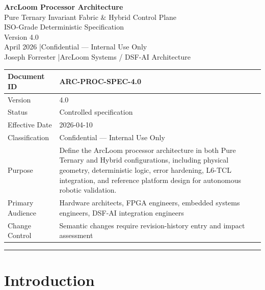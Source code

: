 \documentclass[11pt, a4paper]{article}
\begin{document}
\begin{center}
  {\LARGE \textbf{ArcLoom Processor Architecture}}\\[6pt]
  {\large Pure Ternary Invariant Fabric \& Hybrid Control Plane}\\[4pt]
  {\large ISO-Grade Deterministic Specification}\\[4pt]
  {\large Version 4.0}\\[8pt]
  {\color{al-gray}\small April 2026 \quad|\quad Confidential --- Internal Use Only}\\[4pt]
  {\color{al-gray}\small Joseph Forrester \quad|\quad ArcLoom Systems / DSF-AI Architecture}
\end{center}

\vspace{1em}

\renewcommand{\arraystretch}{1.15}
\begin{tabularx}{\textwidth}{|p{}|Y|}
\hline
Document ID & ARC-PROC-SPEC-4.0 \\\hline
Version & 4.0 \\\hline
Status & Controlled specification \\\hline
Effective Date & 2026-04-10 \\\hline
Classification & Confidential --- Internal Use Only \\\hline
Purpose & Define the ArcLoom processor architecture in both Pure Ternary
          and Hybrid configurations, including physical geometry, deterministic
          logic, error hardening, L6-TCL integration, and reference platform
          design for autonomous robotic validation. \\\hline
Primary Audience & Hardware architects, FPGA engineers, embedded systems
                   engineers, DSF-AI integration engineers \\\hline
Change Control & Semantic changes require revision-history entry and
                 impact assessment \\\hline
\end{tabularx}

\vspace{1em}
\hrule
\vspace{1em}

\tableofcontents
\clearpage


\section{Introduction}
\end{document}
